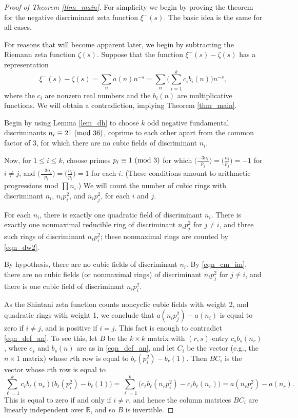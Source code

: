 \documentclass[12pt]{amsart}
\theoremstyle{remark}
\numberwithin{theorem}{section} \numberwithin{equation}{section}
\newcommand{\R}{\mathbb{R}}
\newcommand{\textmod}{{\text {\rm mod}}}
\begin{document}
\begin{proof}[Proof of Theorem \ref{thm_main}]
For simplicity we begin by proving the theorem for the
negative discriminant zeta function $\xi^-(s)$. The basic idea is the same for all cases.

For reasons that will become apparent later, we begin by subtracting the Riemann zeta function $\zeta(s)$.
Suppose that the function $\xi^-(s) - \zeta(s)$ has a representation
\begin{equation}\label{eqn_def_an}
\xi^-(s) - \zeta(s) = \sum_n a(n) n^{-s} =  
\sum_n \bigg( \sum_{i = 1}^k c_i b_i(n) \bigg) n^{-s},
\end{equation}
where the $c_i$ are nonzero real numbers and the $b_i(n)$ are multiplicative functions. We will obtain a contradiction,
implying Theorem \ref{thm_main}.

Begin by using Lemma \ref{lem_dh} to choose $k$ odd negative fundamental discriminants $n_i \equiv 21 \ (\textmod \ 36)$,
coprime to each other apart from the common factor of 3, for which there are no cubic fields of discriminant $n_i$.

Now, for $1 \leq i \leq k$, choose primes $p_i \equiv 1 \ (\textmod \ 3)$ for which 
$\big( \frac{-3 n_i}{p_j} \big) = \big( \frac{n_i}{p_j} \big) = -1$
for $i \neq j$, and $\big( \frac{-3 n_i}{p_i} \big) = \big( \frac{n_i}{p_i} \big) = 1$ for each $i$.
(These conditions amount to arithmetic progressions mod $\prod n_i$.) We will count the number of
cubic rings with discriminant $n_i$, $n_i p_i^2$, and $n_i p_j^2$, for each $i$ and $j$.

For each $n_i$, there is exactly one quadratic field of discriminant $n_i$. There is exactly one nonmaximal
reducible ring of discriminant $n_i p_j^2$ for $j \neq i$, and
three such rings of discriminant $n_i p_i^2$; these nonmaximal rings are counted by \eqref{eqn_dw2}.

By hypothesis, there are no cubic fields of discriminant $n_i$. By \eqref{eqn_cm_im}, there are no
cubic fields (or nonmaximal rings) of discriminant $n_i p_j^2$ for $j \neq i$, and there is one cubic field
of discriminant $n_i p_i^2$.

As the Shintani zeta function counts noncyclic cubic fields with weight 2, and quadratic rings with weight 1,
we conclude that $a(n_i p_j^2) - a(n_i)$ is equal to zero if $i \neq j$, and is positive if $i = j$. This fact 
is enough to contradict \eqref{eqn_def_an}. To see this, 
let $B$ be
the $k \times k$ matrix with $(r, s)$-entry $c_s b_s(n_r)$, where $c_s$ and $b_s(n)$ are as in \eqref{eqn_def_an},
and let $C_i$ be the vector (e.g., the $n \times 1$ matrix) whose $r$th row is equal to $b_r(p_i^2) - b_r(1)$.
Then $B C_i$ is the vector whose $r$th row is equal to 
\begin{equation}
\sum_{\ell = 1}^k c_{\ell} b_{\ell}(n_r) \big(
b_{\ell}(p_i^2) - b_\ell(1) \big) =
\sum_{\ell = 1}^k \Big( c_{\ell} b_{\ell} (n_r p_i^2) - c_{\ell} b_{\ell}(n_r) \Big)
= a(n_r p_i^2) - a(n_r).
\end{equation}
This is equal to zero if and only if $i \neq r$, and hence
the column matrices $B C_i$ are linearly independent over $\R$, and so $B$ is invertible.


\end{proof}
\end{document}
